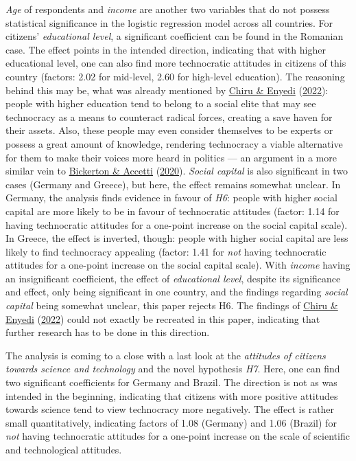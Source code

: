 \documentclass[
  12pt,
  english,
]{article}
\begin{document}
\emph{Age} of respondents and \emph{income} are another two variables
that do not possess statistical significance in the logistic regression
model across all countries. For citizens' \emph{educational level}, a
significant coefficient can be found in the Romanian case. The effect
points in the intended direction, indicating that with higher
educational level, one can also find more technocratic attitudes in
citizens of this country (factors: 2.02 for mid-level, 2.60 for
high-level education). The reasoning behind this may be, what was
already mentioned by \protect\hyperlink{ref-chiru2022wants}{Chiru \&
Enyedi} (\protect\hyperlink{ref-chiru2022wants}{2022}): people with
higher education tend to belong to a social elite that may see
technocracy as a means to counteract radical forces, creating a save
haven for their assets. Also, these people may even consider themselves
to be experts or possess a great amount of knowledge, rendering
technocracy a viable alternative for them to make their voices more
heard in politics --- an argument in a more similar vein to
\protect\hyperlink{ref-bickerton2020technocracy}{Bickerton \& Accetti}
(\protect\hyperlink{ref-bickerton2020technocracy}{2020}). \emph{Social
capital} is also significant in two cases (Germany and Greece), but
here, the effect remains somewhat unclear. In Germany, the analysis
finds evidence in favour of \emph{H6}: people with higher social capital
are more likely to be in favour of technocratic attitudes (factor: 1.14
for having technocratic attitudes for a one-point increase on the social
capital scale). In Greece, the effect is inverted, though: people with
higher social capital are less likely to find technocracy appealing
(factor: 1.41 for \emph{not} having technocratic attitudes for a
one-point increase on the social capital scale). With \emph{income}
having an insignificant coefficient, the effect of \emph{educational
level}, despite its significance and effect, only being significant in
one country, and the findings regarding \emph{social capital} being
somewhat unclear, this paper rejects H6. The findings of
\protect\hyperlink{ref-chiru2022wants}{Chiru \& Enyedi}
(\protect\hyperlink{ref-chiru2022wants}{2022}) could not exactly be
recreated in this paper, indicating that further research has to be done
in this direction.

The analysis is coming to a close with a last look at the
\emph{attitudes of citizens towards science and technology} and the
novel hypothesis \emph{H7}. Here, one can find two significant
coefficients for Germany and Brazil. The direction is not as was
intended in the beginning, indicating that citizens with more positive
attitudes towards science tend to view technocracy more negatively. The
effect is rather small quantitatively, indicating factors of 1.08
(Germany) and 1.06 (Brazil) for \emph{not} having technocratic attitudes
for a one-point increase on the scale of scientific and technological
attitudes.
\end{document}
